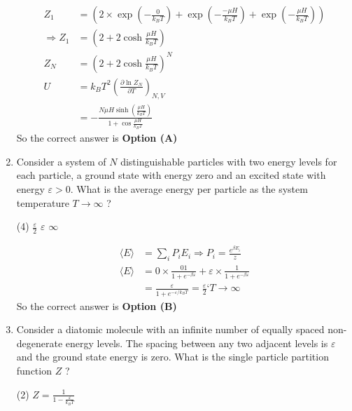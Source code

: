 \begin{enumerate}
\begin{tasks}
	\end{tasks}
	\begin{answer}
		\begin{align*}
		Z_{1}&=\left(2 \times \exp \left(-\frac{0}{k_{B} T}\right)+\exp \left(-\frac{-\mu H}{k_{B} T}\right)+\exp \left(-\frac{\mu H}{k_{B} T}\right)\right) \\\Rightarrow Z_{1}&=\left(2+2 \cosh \frac{\mu H}{k_{B} T}\right)\\
		Z_{N}&=\left(2+2 \cosh \frac{\mu H}{k_{B} T}\right)^{N}\\U&=k_{B} T^{2}\left(\frac{\partial \ln Z_{N}}{\partial T}\right)_{N, V}\\&=-\frac{N \mu H \sinh \left(\frac{\mu H}{k_{B} T}\right)}{1+\cos \frac{\mu H}{k_{B} T}}
		\end{align*}
		So the correct answer is \textbf{Option (A)}
	\end{answer}
	\item 	Consider a system of $N$ distinguishable particles with two energy levels for each particle, a ground state with energy zero and an excited state with energy $\varepsilon>0$. What is the average energy per particle as the system temperature $T \rightarrow \infty$ ?
	{}
	\begin{tasks}(4)
		\task[\textbf{B.}]  $\frac{\varepsilon}{2}$
		\task[\textbf{C.}] $\varepsilon$
		\task[\textbf{D.}] $\infty$
	\end{tasks}
	\begin{answer}
		\begin{align*}
		\langle E\rangle&=\sum_{i} P_{i} E_{i} \Rightarrow P_{i}=\frac{e^{\beta E_{i}}}{z}\\
		\langle E\rangle&=0 \times \frac{01}{1+e^{-\beta \varepsilon}}+\varepsilon \times \frac{1}{1+e^{-\beta \varepsilon}}\\
		&=\frac{\varepsilon}{1+e^{-\varepsilon / k_{B} T}}=\frac{\varepsilon}{2}\text{`}T \rightarrow \infty
		\end{align*}
		So the correct answer is \textbf{Option (B)}
	\end{answer}
	\item Consider a diatomic molecule with an infinite number of equally spaced non-degenerate energy levels. The spacing between any two adjacent levels is $\varepsilon$ and the ground state energy is zero. What is the single particle partition function $Z$ ?
	{}
	\begin{tasks}(2)
		\task[\textbf{A.}] $Z=\frac{1}{1-\frac{\varepsilon}{k_{B} T}}$

\end{tasks}
\end{enumerate}
